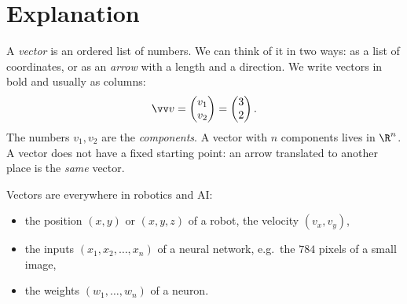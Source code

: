 \label{ch:vectors}

\section*{Explanation}
A \emph{vector} is an ordered list of numbers. We can think of it in two ways: as a list of coordinates, or as an \emph{arrow} with a length and a direction. We write vectors in bold and usually as columns:
\[
\vv v=\begin{pmatrix}v_1\\v_2\end{pmatrix}=\begin{pmatrix}3\\2\end{pmatrix}.
\]
The numbers $v_1,v_2$ are the \emph{components}. A vector with $n$ components lives in $\R^n$. A vector does not have a fixed starting point: an arrow translated to another place is the \emph{same} vector.

\begin{center}

\label{fig:b3_1}
\end{center}

Vectors are everywhere in robotics and AI:
\begin{itemize}
  \item the position $(x,y)$ or $(x,y,z)$ of a robot, the velocity $(v_x,v_y)$,
  \item the inputs $(x_1,x_2,\dots,x_n)$ of a neural network, e.g.\ the $784$ pixels of a small image,
  \item the weights $(w_1,\dots,w_n)$ of a neuron.
\end{itemize}

